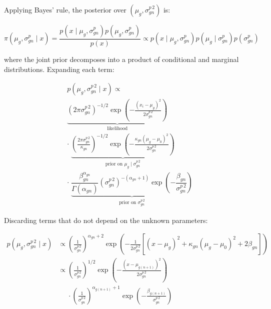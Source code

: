 \documentclass[]{article}
\begin{document}
\noindent Applying Bayes' rule, the posterior over $(\mu_g, \sigma^{p\,2}_{gn})$ is:

\begin{center}
	\vspace{0.2cm}
	$\pi\!\left(\mu_g, \sigma^p_{gn} \mid x\right) 
	= \dfrac{p\!\left(x \mid \mu_g, \sigma^p_{gn}\right) 
		p\!\left(\mu_g, \sigma^p_{gn}\right)}{p(x)}
	\propto p\!\left(x \mid \mu_g, \sigma^p_{gn}\right) 
	p\!\left(\mu_g \mid \sigma^p_{gn}\right) 
	p\!\left(\sigma^p_{gn}\right)$
	\vspace{0.2cm}
\end{center}

\noindent where the joint prior decomposes into a product of conditional and marginal 
distributions. Expanding each term:

\begin{gather*}
	p\!\left(\mu_g, \sigma^{p\,2}_{gn} \mid x\right) \propto \\[8pt]
	\underbrace{\left(2\pi\sigma^{p\,2}_{gn}\right)^{-1/2}
		\exp\!\left(-\frac{(x_i - \mu_g)^2}{2\sigma^{p\,2}_{gn}}\right)
	}_{\text{likelihood}}\\[10pt]
	\cdot\;
	\underbrace{\left(\frac{2\pi\sigma^{p\,2}_{gn}}{\kappa_{gn}}\right)^{-1/2}
		\exp\!\left(-\frac{\kappa_{gn}(\mu_g - \mu_0)^2}{2\sigma^{p\,2}_{gn}}\right)
	}_{\text{prior on } \mu_g \mid \sigma^{p\,2}_{gn}}\\[10pt]
	\cdot\;
	\underbrace{\dfrac{\beta_{gn}^{\alpha_{gn}}}{\Gamma(\alpha_{gn})}
		\left(\sigma^{p\,2}_{gn}\right)^{-(\alpha_{gn}+1)}
		\exp\!\left(-\dfrac{\beta_{gn}}{\sigma^{p\,2}_{gn}}\right)
	}_{\text{prior on }\sigma^{p\,2}_{gn}}
\end{gather*}

\noindent Discarding terms that do not depend on the unknown parameters:

\begin{align*}
	p\!\left(\mu_g, \sigma^{p\,2}_{gn} \mid x\right) 
	&\propto 
	\left(\frac{1}{\sigma^{p\,2}_{gn}}\right)^{\alpha_{gn}+2}
	\exp\!\left(-\frac{1}{2\sigma^{p\,2}_{gn}}
	\left[(x-\mu_g)^2 + \kappa_{gn}(\mu_g - \mu_0)^2 + 2\beta_{gn}\right]\right)\\[10pt]
	&\propto
	\left(\frac{1}{\sigma^{p\,2}_{gn}}\right)^{1/2}
	\exp\!\left(-\frac{(x - \mu_{g(n+1)})^2}{2\sigma^{p\,2}_{gn}}\right)\\
	&\phantom{{}\propto{}}
	\cdot\left(\frac{1}{\sigma^{p\,2}_{gn}}\right)^{\alpha_{g(n+1)}+1}
	\exp\!\left(-\frac{\beta_{g(n+1)}}{\sigma^{p\,2}_{gn}}\right)
\end{align*}
\end{document}
